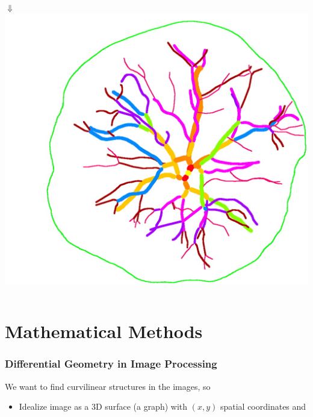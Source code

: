 \documentclass[9pt,notes]{beamer}
\begin{document}
\begin{frame}
\begin{columns}[c]
\begin{column}{0.5\textwidth}
    {\Huge $\Downarrow$}\\
    \includegraphics[height=0.36\textheight]{earli_crop_trace.jpg}
  \end{column}
  \end{columns}
\end{frame}
%	
%	


\section[Math Methods]{Mathematical Methods}
\begin{frame}
\frametitle{Differential Geometry in Image Processing}
  We want to find curvilinear structures in the images, so 
\begin{itemize}
  \item Idealize image as a 3D surface (a graph) with $(x,y)$ spatial coordinates and
        
\end{itemize}
\end{frame}
\end{document}
